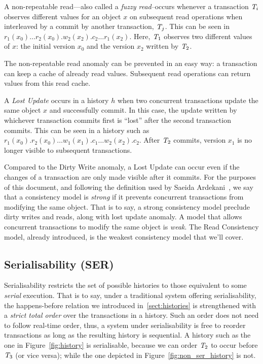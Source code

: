 \begin{definition}
A non-repeatable read---also called a \emph{fuzzy read}--occurs whenever a transaction $\mathit{T}_i$ observes different values for an object $x$ on subsequent read operations when interleaved by a commit by another transaction, $\mathit{T}_j$. This can be seen in $r_1(x_0)\ldots r_2(x_0).w_2(x_2).c_2 \ldots r_1(x_2)$. Here, $\mathit{T}_1$ observes two different values of $x$: the initial version $x_0$ and the version $x_2$ written by $\mathit{T}_2$.
\end{definition}

The non-repeatable read anomaly can be prevented in an easy way: a transaction can keep a cache of already read values. Subsequent read operations can return values from this read cache.

\begin{definition}
A \emph{Lost Update} occurs in a history $h$ when two concurrent transactions update the same object $x$ and successfully commit. In this case, the update written by whichever transaction commits first is ``lost'' after the second transaction commits. This can be seen in a history such as $r_1(x_0).r_2(x_0) \ldots w_1(x_1).c_1\ldots w_2(x_2).c_2$. After $\mathit{T}_2$ commits, version $x_1$ is no longer visible to subsequent transactions.
\end{definition}

Compared to the Dirty Write anomaly, a Lost Update can occur even if the changes of a transaction are only made visible after it commits. For the purposes of this document, and following the definition used by Saeida Ardekani~\citep{ardekani_thesis}, we say that a consistency model is \emph{strong} if it prevents concurrent transactions from modifying the same object. That is to say, a strong consistency model preclude dirty writes and reads, along with lost update anomaly. A model that allows concurrent transactions to modify the same object is \emph{weak}. The Read Consistency model, already introduced, is the weakest consistency model that we'll cover.

\subsection{Serialisability (SER)}
\label{sect:ser}

Serialisability restricts the set of possible histories to those equivalent to some \emph{serial} execution. That is to say, under a traditional system offering serialisability, the happens-before relation we introduced in~\ref{sect:histories} is strengthened with a \emph{strict total order} over the transactions in a history. Such an order does not need to follow real-time order, thus, a system under serialisability is free to reorder transactions as long as the resulting history is sequential. A history such as the one in Figure~\ref{fig:history} is serialisable, because we can order $\mathit{T}_2$ to occur before $\mathit{T}_3$ (or vice versa); while the one depicted in Figure~\ref{fig:non_ser_history} is not.

